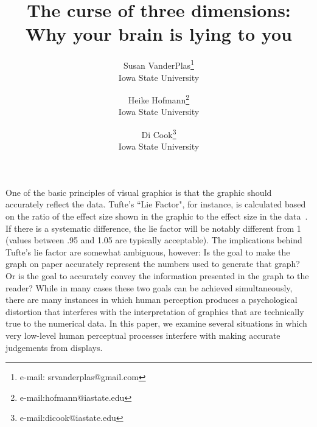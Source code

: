 \documentclass[journal]{vgtc}\usepackage{graphicx, color}
\title{The curse of three dimensions: Why your brain is lying to you}
\author{Susan VanderPlas\thanks{e-mail: srvanderplas@gmail.com}\\ %
        \scriptsize Iowa State University %
\and Heike Hofmann\thanks{e-mail:hofmann@iastate.edu}\\ %
        \scriptsize Iowa State University %
\and Di Cook\thanks{e-mail:dicook@iastate.edu}\\ %
        \scriptsize Iowa State University %
}
\begin{document}
\maketitle

One of the basic principles of visual graphics is that the graphic should accurately reflect the data. Tufte's ``Lie Factor", for instance, is calculated based on the ratio of the effect size shown in the graphic to the effect size in the data~\citep{tufte}. If there is a systematic difference, the lie factor will be notably different from 1 (values between .95 and 1.05 are typically acceptable). The implications behind Tufte's lie factor are somewhat ambiguous, however: Is the goal to make the graph on paper accurately represent the numbers used to generate that graph? Or is the goal to accurately convey the information presented in the graph to the reader? While in many cases these two goals can be achieved simultaneously, there are many instances in which human perception produces a psychological distortion that  interferes with the interpretation of graphics that are technically true to the numerical data. In this paper, we examine several situations in which very low-level human perceptual processes interfere with making accurate judgements from displays.
\end{document}
